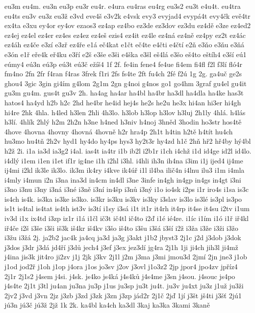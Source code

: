{eu3m
eu4m.
eu3n
eu3p
eu3r
eu4r.
e4ura
eu4ras
eu4rg
eu3s2
eu3t
e4u4t.
eu4tra
eu4ts
eu3v
eu3z
eu3ž
e3vd
eve4š
e3v2k
e4vsk
evy3
evyjad4
evypá4t
evy4čk
evě4tr
ex4ta
e3xu
ey4or
ey4ov
ezaos3
ez4ap
ez4bo
ez3de
ez3dov
ez3du
ez4dě
e3ze
ez4ed2
ez4ej
ez4el
ez4er
ez4es
ez4ez
ez4eš
ezis4
ez4it
ez4le
ez4ná
ez4ně
ez4py
ez2t
ez4ác
ez4áh
ez4če
e3zí
e3zř
ez4ře
e1á
eč4kat
e1čt
eč4te
e4čti
e4čtí
e2ň
e3ňo
e3ňu
e3ňá
e3ón
e1ř
eře4k
eř4ku
e3ří
e2š
e3še
e3ši
e4ška
e3šl
eš4lá
e3šo
eš4to
eštíh4
e3ší
eú1
eúmy4
eú3n
eú3p
eú3t
eú3č
ežíš4
1f
2f.
fe4in
fene4
fe4ue
fi4em
fi4fl
f2l
f3lí
fló4r
fm4no
2fn
2fr
f4ran
f4ras
3frek
f1ri
2fs
fs4te
2ft
fu4ch
2fé
f2ú
1g
2g.
ga4uč
ge2s
ghou4
3gic
3gin
gi4ím
g4lom
2g1m
2gn
g4noi
g4nos
go1
go4hm
3graf
gu4el
gu4it
gu3m
gu4m.
gus4t
gu3v
2h.
ha4ag
ha4ar
ha4bl
ha4br
ha3dl
ha4dla
ha4ke
has3t
hatos4
ha4yd
h2b
h2c
2hd
he4br
he4id
hej4s
he2s
he2u
he3x
hi4an
hi3er
hi4gh
hi4re
2hk
4hla.
h4led
h3len
2hli
4h3lo.
h3lob
h3lop
h3lov
h3luj
2h1ly
4hlá.
h4lás
h3lí.
4hlík
2hlý
h2m
2h2n
h3ne
h4ned
h3niv
h4noj
3hněd
3hodin
ho3str
hos4tě
4hove
4hovna
4hovny
4hovná
4hovně
h2r
hra4p
2h1t
h4tin
h2tě
h4tít
hu4ch
hu3mo
hu4tň
2h2v
hyd1
hy4do
hy4ps
hys3
hy2t3r
hy4zd
h1č
2hň
hř2
hř4by
hý4bl
h2ž
2i.
i1a
ia3d
ia3g2
i4al.
ias4t
ia4tr
i1b
ib2l
i2b1r
i1ch
i4chž
i1d
id4ge
id2l
id4lo.
i4dlý
i1em
i1en
i1et
if1r
ig4ne
i1h
i2hl
i3hl.
i4hli
ih3n
ih4na
i3im
i1j
ijed4
ij4me
ij4mi
i2kl
ik3le
ik3lo.
ik3m
ik4ry
i4kve
ik4úř
i1l
il4ba
ilič4n
i4lnu
ilu3
i1m
i4mla
i4mly
i4mun
i2n
i3na
ina3d
in4cm
in4dl
i3ne
3infe
in4gh
in4gp
in4gs
in4gt
i3ni
i3no
i3nu
i3ny
i3ná
i3né
i3ně
i3ní
in4šp
i3nů
i3ný
i1o
io4sk
i2ps
i1r
iro4s
i1sa
is3c
is4ch
is4k.
is3ka
is3ke
is3ko.
is3kr
is3ku
is3kv
is3ky
i3slav
is3lo
is3lé
is3pl
is3po
is1t
is4tal
is4tat
is4th
ist3v
is3tí
i1sy
i3sá
i1t
it1r
it4rh
it4rp
it4se
it4su
i2tv
i1um
iv3d
i1x
ix4td
i3zp
iz1r
i1á
i1čl
ič3t
ič4tl
ič4to
i2ď
i1é
ié4re.
i1íc
i1ím
i1ó
i1ř
iř4kl
iř4če
i2š
i3še
i3ši
iš3k
iš4kr
iš4kv
i3šo
iš4to
i3šu
i3šá
i3ší
i2ž
i3ža
i3že
i3ži
i3žo
i3žu
i3žá
2j.
ja2b2
jac4k
ja4cq
ja3d
ja3g
j3akt
j1b2
jbyst3
2j1c
j2d
j3dob
j3dok
j3dos
j3dr
j3dá
jd4ří
j3dů
jech4
j3ef
j3ex
jez3dí
jg4ra
2j1h
1ji
ji4ch
jih3l
ji4mž
j4ina
jis3k
jit4ro
ji2zv
j1j
2jk
j3kv
2j1l
j2m
j3ma
j3mi
jmou3d
2jmí
2jn
jne3
j1ob
j1od
jod2ř
j1oh
j1op
j4ora
j1os
jo3sv
j2ov
j3ovl
j1o3z2
2jp
jpor4
jpo4zv
jpříz4
2j1r
2j1s2
j4sem
j4si.
j4sk.
js4ko
js4ká
j4s4ků
j4s4me
j3sn
j4sou.
j4souc
js4po
j4s4te
2j1t
j3tl
ju4an
ju3na
ju3p
j1us
ju3sp
ju3t
ju4t.
ju3v
ju4xt
ju3z
j1už
ju3ži
2jv2
j3vd
j3vn
2jz
j3zb
j3zd
j3zk
j3zn
j3zp
jád2r
2j1č
2jď
1jí
j3št
jš4ti
j3šť
2jú1
jú3n
jú3č
jú3ž
2jž
1k
2k.
ka4bl
ka4ch
ka3dl
3kaj
ka3ka
3kami
3kaně
}
